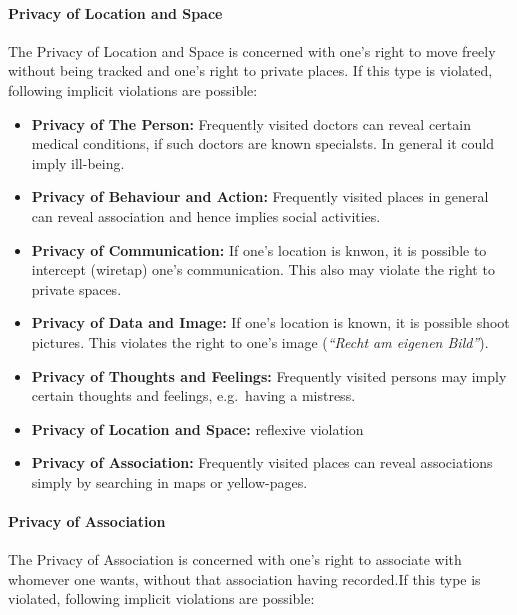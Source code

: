 \paragraph*{Privacy of Location and Space}

The Privacy of Location and Space is concerned with one's right to move
freely without being tracked and one's right to private places. If this
type is violated, following implicit violations are possible:

\begin{itemize}

\item
  \textbf{Privacy of The Person:} Frequently visited doctors can reveal
  certain medical conditions, if such doctors are known specialsts. In
  general it could imply ill-being.
\item
  \textbf{Privacy of Behaviour and Action:} Frequently visited places in
  general can reveal association and hence implies social activities.
\item
  \textbf{Privacy of Communication:} If one's location is knwon, it is
  possible to intercept (wiretap) one's communication. This also may
  violate the right to private spaces.
\item
  \textbf{Privacy of Data and Image:} If one's location is known, it is
  possible shoot pictures. This violates the right to one's image
  (\emph{``Recht am eigenen Bild''}).
\item
  \textbf{Privacy of Thoughts and Feelings:} Frequently visited persons
  may imply certain thoughts and feelings, e.g.~having a mistress.
\item
  \textbf{Privacy of Location and Space:} reflexive violation
\item
  \textbf{Privacy of Association:} Frequently visited places can reveal
  associations simply by searching in maps or yellow-pages.
\end{itemize}

\paragraph*{Privacy of Association}

The Privacy of Association is concerned with one's right to associate
with whomever one wants, without that association having recorded.If
this type is violated, following implicit violations are possible:

